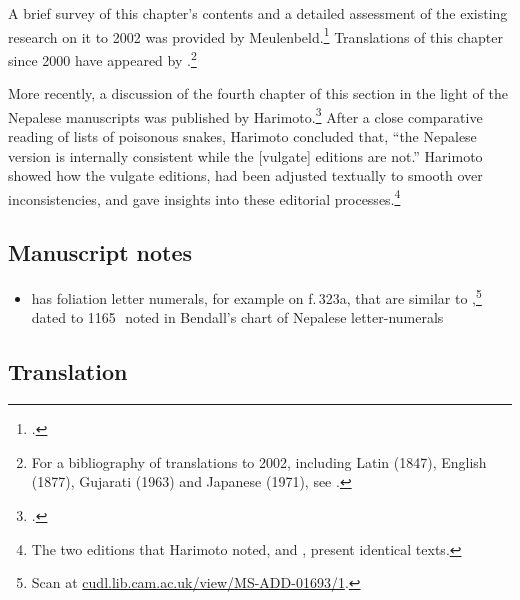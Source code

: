 A brief survey of this chapter's contents and a detailed assessment of the
existing research on it to 2002 was provided by Meulenbeld.\footcite[IA,
289--290]{meul-hist} Translations of this chapter since 2000 have appeared by 
\textcites[131--139]{wuja-2003}[3, 1--15]{shar-susr}{srik-2002}.\footnote{For a 
bibliography of translations to 2002, including Latin (1847), English (1877), Gujarati (1963) 
and Japanese (1971), see \cite[IB, 314--315]{meul-hist}.}

More recently, a discussion of the fourth chapter of this section in the light of
the Nepalese manuscripts was published by Harimoto.\footcite[101--104]{hari-2011}
After a close comparative reading of lists of poisonous snakes, Harimoto concluded
that, “the Nepalese version is internally consistent while the [vulgate] editions
are not.”  Harimoto showed how the vulgate editions, had been adjusted textually to smooth 
over inconsistencies, and gave
insights into these editorial processes.\footnote{The two editions
 that Harimoto noted, \cite{vulgate} and \cite{bhat-1889}, present identical
texts.}



\subsection{Manuscript notes}

\begin{itemize}
    \item {} has foliation letter numerals, for example
on f.\,323a, that are similar to ,\footnote{Scan
at 
\href{https://cudl.lib.cam.ac.uk/view/MS-ADD-01693/1}{cudl.lib.cam.ac.uk/view/MS-ADD-01693/1}.}
 dated to 1165\,\CE\, noted in Bendall's chart of Nepalese letter-numerals \cite[Lithograph V, 
after p.\,225]{bend-budd}
\end{itemize}

\newpage

\subsection{Translation}

